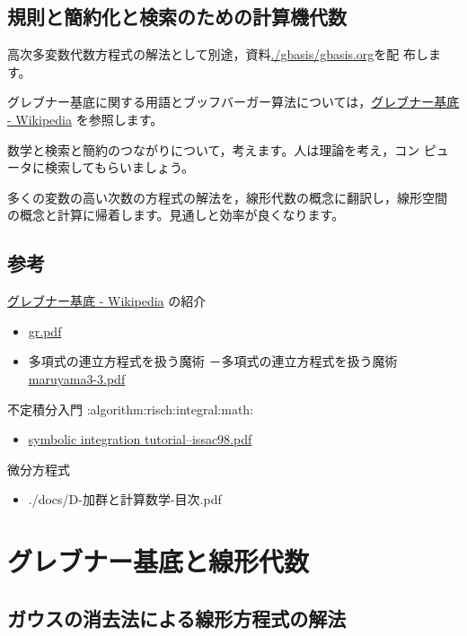 \documentclass[dvipdfmx,11pat]{jarticle}
\begin{document}
\subsection{規則と簡約化と検索のための計算機代数}
\label{sec:orgf2c0112}

高次多変数代数方程式の解法として別途，資料\url{./gbasis/gbasis.org}を配
布します。

グレブナー基底に関する用語とブッフバーガー算法については，\href{https://ja.wikipedia.org/wiki/\%E3\%82\%B0\%E3\%83\%AC\%E3\%83\%96\%E3\%83\%8A\%E3\%83\%BC\%E5\%9F\%BA\%E5\%BA\%95}{グレブナー基底 - Wikipedia} 
を参照します。

数学と検索と簡約のつながりについて，考えます。人は理論を考え，コン
ピュータに検索してもらいましょう。

多くの変数の高い次数の方程式の解法を，線形代数の概念に翻訳し，線形空間
の概念と計算に帰着します。見通しと効率が良くなります。
\subsection{参考}
\label{sec:org0bc2d19}
\href{https://ja.wikipedia.org/wiki/\%E3\%82\%B0\%E3\%83\%AC\%E3\%83\%96\%E3\%83\%8A\%E3\%83\%BC\%E5\%9F\%BA\%E5\%BA\%95}{グレブナー基底 - Wikipedia} の紹介
\begin{itemize}
\item \href{http://math.shinshu-u.ac.jp/\~hanaki/dvi/gr.pdf}{gr.pdf}
\item 多項式の連立方程式を扱う魔術 －多項式の連立方程式を扱う魔術
\href{https://www.mathsoc.jp/publication/tushin/0303/maruyama3-3.pdf}{maruyama3-3.pdf}
\end{itemize}

不定積分入門                              :algorithm:risch:integral:math:
\begin{itemize}
\item \href{http://www-sop.inria.fr/cafe/Manuel.Bronstein/publications/issac98.pdf}{symbolic integration tutorial--issac98.pdf}
\end{itemize}

微分方程式
\begin{itemize}
\item ./docs/D-加群と計算数学-目次.pdf
\end{itemize}
\section{グレブナー基底と線形代数}
\label{sec:org5b73f93}
\subsection{ガウスの消去法による線形方程式の解法}
\label{sec:org365e63b}
\end{document}
